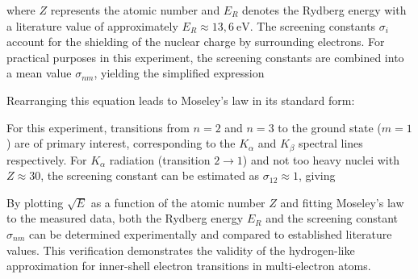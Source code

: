 where $Z$ represents the atomic number and $E_R$ denotes the Rydberg energy with a literature value of approximately $E_R \approx 13{,}6~\text{eV}$. The screening constants $\sigma_i$ account for the shielding of the nuclear charge by surrounding electrons. For practical purposes in this experiment, the screening constants are combined into a mean value $\sigma_{nm}$, yielding the simplified expression

Rearranging this equation leads to Moseley's law in its standard form:

For this experiment, transitions from $n=2$ and $n=3$ to the ground state ($m=1$) are of primary interest, corresponding to the $K_\alpha$ and $K_\beta$ spectral lines respectively. For $K_\alpha$ radiation (transition $2 \rightarrow 1$) and not too heavy nuclei with $Z \approx 30$, the screening constant can be estimated as $\sigma_{12} \approx 1$, giving

By plotting $\sqrt{E}$ as a function of the atomic number $Z$ and fitting Moseley's law to the measured data, both the Rydberg energy $E_R$ and the screening constant $\sigma_{nm}$ can be determined experimentally and compared to established literature values. This verification demonstrates the validity of the hydrogen-like approximation for inner-shell electron transitions in multi-electron atoms.

